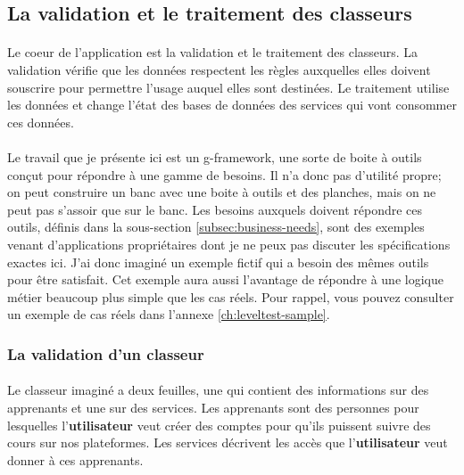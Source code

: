 \subsection{La validation et le traitement des classeurs}
\label{subsec:spreadsheet-use-case}

\paragraph{}
Le coeur de l'application est la validation et le traitement des classeurs.
La validation vérifie que les données respectent les règles auxquelles elles doivent souscrire pour permettre l'usage auquel elles sont destinées.
Le traitement utilise les données et change l'état des bases de données des services qui vont consommer ces données.

\paragraph{}
Le travail que je présente ici est un \gls{g-framework}, une sorte de boite à outils conçut pour répondre à une gamme de besoins.
Il n'a donc pas d'utilité propre; on peut construire un banc avec une boite à outils et des planches, mais on ne peut pas s'assoir que sur le banc.
Les besoins auxquels doivent répondre ces outils, définis dans la sous-section \ref{subsec:business-needs}, sont des exemples venant d'applications propriétaires dont je ne peux pas discuter les spécifications exactes ici.
J'ai donc imaginé un exemple fictif qui a besoin des mêmes outils pour être satisfait.
Cet exemple aura aussi l'avantage de répondre à une logique métier beaucoup plus simple que les cas réels.
Pour rappel, vous pouvez consulter un exemple de cas réels dans l'annexe \ref{ch:leveltest-sample}.

\subsubsection{La validation d'un classeur}
\label{subsubsec:spreadsheet-validation-case}

\paragraph{}
Le classeur imaginé a deux feuilles, une qui contient des informations sur des apprenants et une sur des services.
Les apprenants sont des personnes pour lesquelles l'\textbf{utilisateur} veut créer des comptes pour qu'ils puissent suivre des cours sur nos plateformes.
Les services décrivent les accès que l'\textbf{utilisateur} veut donner à ces apprenants.

